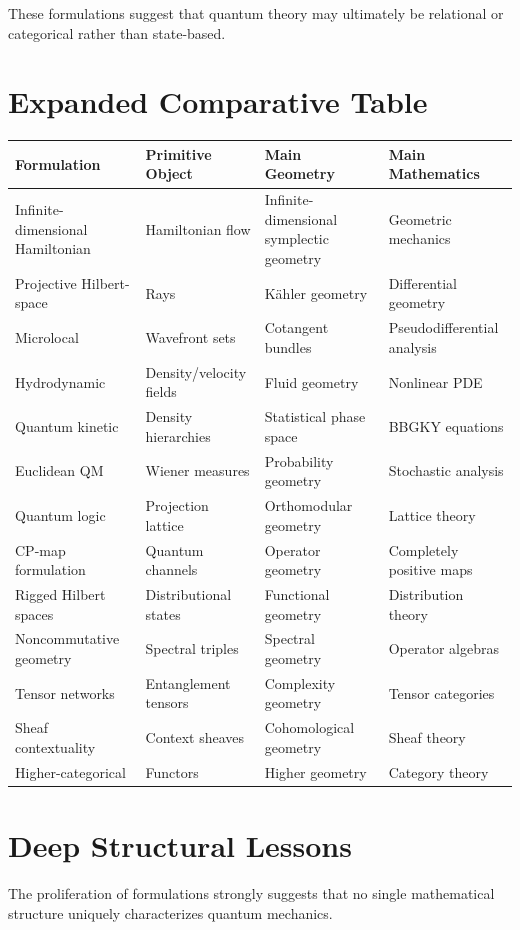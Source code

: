 \documentclass[11pt]{article}
\begin{document}
These formulations suggest that quantum theory may ultimately be relational or categorical rather than state-based.

\section{Expanded Comparative Table}

\begin{longtable}{p{3cm}p{3cm}p{4cm}p{4cm}}
\toprule
Formulation & Primitive Object & Main Geometry & Main Mathematics \\
\midrule
Infinite-dimensional Hamiltonian & Hamiltonian flow & Infinite-dimensional symplectic geometry & Geometric mechanics \\
Projective Hilbert-space & Rays & K\"ahler geometry & Differential geometry \\
Microlocal & Wavefront sets & Cotangent bundles & Pseudodifferential analysis \\
Hydrodynamic & Density/velocity fields & Fluid geometry & Nonlinear PDE \\
Quantum kinetic & Density hierarchies & Statistical phase space & BBGKY equations \\
Euclidean QM & Wiener measures & Probability geometry & Stochastic analysis \\
Quantum logic & Projection lattice & Orthomodular geometry & Lattice theory \\
CP-map formulation & Quantum channels & Operator geometry & Completely positive maps \\
Rigged Hilbert spaces & Distributional states & Functional geometry & Distribution theory \\
Noncommutative geometry & Spectral triples & Spectral geometry & Operator algebras \\
Tensor networks & Entanglement tensors & Complexity geometry & Tensor categories \\
Sheaf contextuality & Context sheaves & Cohomological geometry & Sheaf theory \\
Higher-categorical & Functors & Higher geometry & Category theory \\
\bottomrule
\end{longtable}

\section{Deep Structural Lessons}

The proliferation of formulations strongly suggests that no single mathematical structure uniquely characterizes quantum mechanics.
\end{document}
